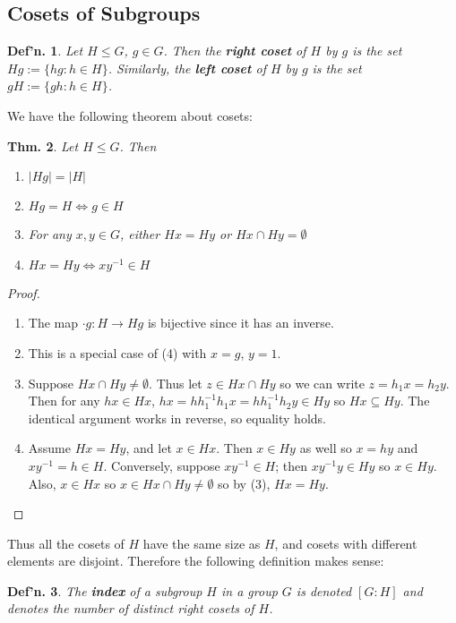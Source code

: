 \documentclass[12pt, a4paper]{book}
\newtheorem{theorem}{Thm.}[section]
\newtheorem{definition}[theorem]{Def'n.}
\theoremstyle{nonumberplain}
\newtheorem{proof}{Proof}
\begin{document}
\subsection{Cosets of Subgroups}
\begin{definition}
    Let $H\leq G$, $g\in G$.
    Then the \textbf{right coset} of $H$ by $g$ is the set $Hg:=\{hg:h\in H\}$.
    Similarly, the \textbf{left coset} of $H$ by $g$ is the set $gH:=\{gh:h\in H\}$.
\end{definition}
We have the following theorem about cosets:
\begin{theorem}
    Let $H\leq G$.
    Then
    \begin{enumerate}[nolistsep]
        \item $|Hg|=|H|$
        \item $Hg=H\Leftrightarrow g\in H$
        \item For any $x,y\in G$, either $Hx=Hy$ or $Hx\cap Hy=\emptyset$
        \item $Hx=Hy\Leftrightarrow xy^{-1}\in H$
    \end{enumerate}
\end{theorem}
\begin{proof}
    \begin{enumerate}
        \item The map $\cdot g:H\to Hg$ is bijective since it has an inverse.
        \item This is a special case of (4) with $x=g$, $y=1$.
        \item Suppose $Hx\cap Hy\neq\emptyset$.
            Thus let $z\in Hx\cap Hy$ so we can write $z=h_1x=h_2y$.
            Then for any $hx\in Hx$, $hx=hh_1^{-1}h_1x=hh_1^{-1}h_2y\in Hy$ so $Hx\subseteq Hy$.
            The identical argument works in reverse, so equality holds.
        \item Assume $Hx=Hy$, and let $x\in Hx$.
            Then $x\in Hy$ as well so $x=hy$ and $xy^{-1}=h\in H$.
            Conversely, suppose $xy^{-1}\in H$; then $xy^{-1}y\in Hy$ so $x\in Hy$.
            Also, $x\in Hx$ so $x\in Hx\cap Hy\neq\emptyset$ so by (3), $Hx=Hy$.
    \end{enumerate}
\end{proof}
Thus all the cosets of $H$ have the same size as $H$, and cosets with different elements are disjoint.
Therefore the following definition makes sense:
\begin{definition}
    The \textbf{index} of a subgroup $H$ in a group $G$ is denoted $[G:H]$ and denotes the number of distinct right cosets of $H$.
\end{definition}
\end{document}
